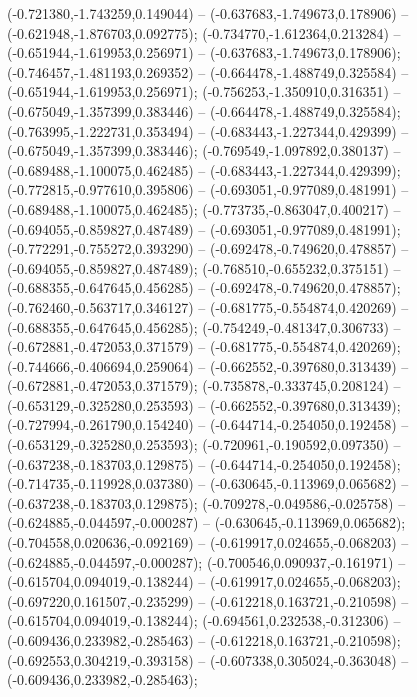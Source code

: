  (-0.721380,-1.743259,0.149044) -- (-0.637683,-1.749673,0.178906) -- (-0.621948,-1.876703,0.092775);
 (-0.734770,-1.612364,0.213284) -- (-0.651944,-1.619953,0.256971) -- (-0.637683,-1.749673,0.178906);
 (-0.746457,-1.481193,0.269352) -- (-0.664478,-1.488749,0.325584) -- (-0.651944,-1.619953,0.256971);
 (-0.756253,-1.350910,0.316351) -- (-0.675049,-1.357399,0.383446) -- (-0.664478,-1.488749,0.325584);
 (-0.763995,-1.222731,0.353494) -- (-0.683443,-1.227344,0.429399) -- (-0.675049,-1.357399,0.383446);
 (-0.769549,-1.097892,0.380137) -- (-0.689488,-1.100075,0.462485) -- (-0.683443,-1.227344,0.429399);
 (-0.772815,-0.977610,0.395806) -- (-0.693051,-0.977089,0.481991) -- (-0.689488,-1.100075,0.462485);
 (-0.773735,-0.863047,0.400217) -- (-0.694055,-0.859827,0.487489) -- (-0.693051,-0.977089,0.481991);
 (-0.772291,-0.755272,0.393290) -- (-0.692478,-0.749620,0.478857) -- (-0.694055,-0.859827,0.487489);
 (-0.768510,-0.655232,0.375151) -- (-0.688355,-0.647645,0.456285) -- (-0.692478,-0.749620,0.478857);
 (-0.762460,-0.563717,0.346127) -- (-0.681775,-0.554874,0.420269) -- (-0.688355,-0.647645,0.456285);
 (-0.754249,-0.481347,0.306733) -- (-0.672881,-0.472053,0.371579) -- (-0.681775,-0.554874,0.420269);
 (-0.744666,-0.406694,0.259064) -- (-0.662552,-0.397680,0.313439) -- (-0.672881,-0.472053,0.371579);
 (-0.735878,-0.333745,0.208124) -- (-0.653129,-0.325280,0.253593) -- (-0.662552,-0.397680,0.313439);
 (-0.727994,-0.261790,0.154240) -- (-0.644714,-0.254050,0.192458) -- (-0.653129,-0.325280,0.253593);
 (-0.720961,-0.190592,0.097350) -- (-0.637238,-0.183703,0.129875) -- (-0.644714,-0.254050,0.192458);
 (-0.714735,-0.119928,0.037380) -- (-0.630645,-0.113969,0.065682) -- (-0.637238,-0.183703,0.129875);
 (-0.709278,-0.049586,-0.025758) -- (-0.624885,-0.044597,-0.000287) -- (-0.630645,-0.113969,0.065682);
 (-0.704558,0.020636,-0.092169) -- (-0.619917,0.024655,-0.068203) -- (-0.624885,-0.044597,-0.000287);
 (-0.700546,0.090937,-0.161971) -- (-0.615704,0.094019,-0.138244) -- (-0.619917,0.024655,-0.068203);
 (-0.697220,0.161507,-0.235299) -- (-0.612218,0.163721,-0.210598) -- (-0.615704,0.094019,-0.138244);
 (-0.694561,0.232538,-0.312306) -- (-0.609436,0.233982,-0.285463) -- (-0.612218,0.163721,-0.210598);
 (-0.692553,0.304219,-0.393158) -- (-0.607338,0.305024,-0.363048) -- (-0.609436,0.233982,-0.285463);
